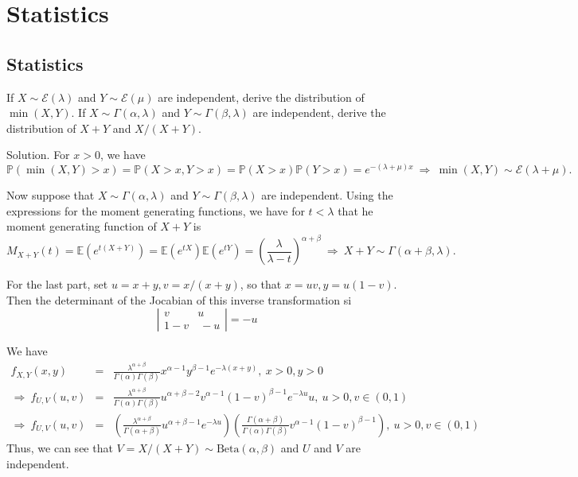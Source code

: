 

\chapter{Statistics}

\section{Statistics}

\ben

\item If $X\sim\mathcal{E}(\lambda)$ and  $Y\sim\mathcal{E}(\mu)$ are independent, derive the distribution of $\min(X,Y)$. If  $X\sim\Gamma(\alpha,\lambda)$ and $Y\sim\Gamma(\beta,\lambda)$ are independent, derive the distribution of $X+Y$ and $X/(X+Y)$.



Solution. For $x>0$, we have
\begin{equation}
\mathbb{P}\left(\min(X,Y)>x\right) = \mathbb{P}(X>x,Y>x) =\mathbb{P}(X>x)\mathbb{P}(Y>x) = e^{-(\lambda+\mu)x} \ \Rightarrow\ \min(X,Y)\sim \mathcal{E}(\lambda+\mu).
\end{equation}

Now suppose that $X\sim\Gamma(\alpha,\lambda)$ and $Y\sim\Gamma(\beta,\lambda)$ are independent. Using the expressions for the moment generating functions, we have for $t<\lambda$ that he moment generating function of $X+Y$ is
\begin{equation}
M_{X+Y}(t) = \mathbb{E}(e^{t(X+Y)}) =\mathbb{E}(e^{tX})\mathbb{E}(e^{tY}) = \left(\frac{\lambda}{\lambda-t}\right)^{\alpha+\beta} \ \Rightarrow\ X+Y\sim \Gamma(\alpha+\beta,\lambda).
\end{equation}

For the last part, set $u=x+y, v=x/(x+y)$, so that $x = uv, y= u(1-v)$. Then the determinant of the Jocabian of this inverse transformation si
\begin{equation}
\left|\begin{array}{cc}
v & u \\
1-v & \ -u
\end{array}
\right|=-u
\end{equation}

We have
\begin{eqnarray}
f_{X,Y}(x,y) & = & \frac{\lambda^{\alpha+\beta}}{\Gamma(\alpha)\Gamma(\beta)}x^{\alpha-1}y^{\beta-1}e^{-\lambda(x+y)}, \ x>0,y>0 \nonumber\\
 \Rightarrow \ f_{U,V}(u,v) & = & \frac{\lambda^{\alpha+\beta}}{\Gamma(\alpha)\Gamma(\beta)}u^{\alpha+\beta-2}v^{\alpha-1}(1-v)^{\beta-1}e^{-\lambda u}u, \ u>0,v\in(0,1) \nonumber\\
 \Rightarrow \ f_{U,V}(u,v) & = & \left(\frac{\lambda^{\alpha+\beta}}{\Gamma(\alpha+\beta)}u^{\alpha+\beta-1} e^{-\lambda u} \right)\left(\frac{\Gamma(\alpha+\beta)}{\Gamma(\alpha)\Gamma(\beta)}v^{\alpha-1}(1-v)^{\beta-1}\right), \ u>0,v\in(0,1)
\end{eqnarray}
Thus, we can see that $V=X/(X+Y)\sim\text{Beta}(\alpha,\beta)$ and $U$ and $V$ are independent.





